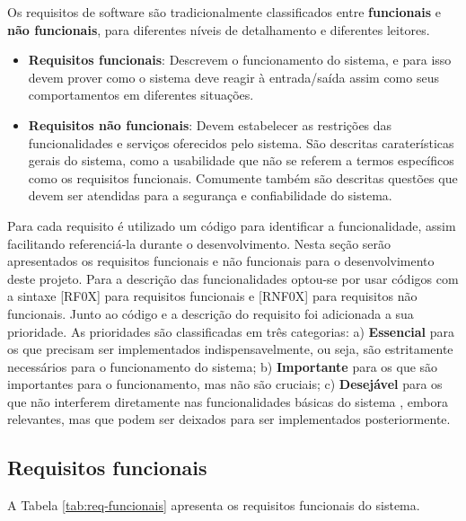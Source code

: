 Os requisitos de software são tradicionalmente classificados entre \textbf{funcionais} e \textbf{não funcionais}, para diferentes níveis de detalhamento e diferentes leitores.

\begin{itemize}
	\item{\textbf{Requisitos funcionais}: Descrevem o funcionamento do sistema, e para isso devem prover como o sistema deve reagir à entrada/saída assim como seus comportamentos em diferentes situações.}
	
	\item{\textbf{Requisitos não funcionais}: Devem estabelecer as restrições das funcionalidades e serviços oferecidos pelo sistema. São descritas caraterísticas gerais do sistema, como a usabilidade que não se referem a termos específicos como os requisitos funcionais. Comumente também são descritas questões que devem ser atendidas para a segurança e confiabilidade do sistema.}
\end{itemize}

Para cada requisito é utilizado um código para identificar a funcionalidade, assim facilitando referenciá-la durante o desenvolvimento. Nesta seção serão apresentados os requisitos funcionais e não funcionais para o desenvolvimento deste projeto. Para a descrição das funcionalidades optou-se por usar códigos com a sintaxe [RF0X] para requisitos funcionais e [RNF0X] para requisitos não funcionais. Junto ao código e a descrição do requisito foi adicionada a sua prioridade. As prioridades são classificadas em três categorias: a) \textbf{Essencial} para os que precisam ser implementados indispensavelmente, ou seja, são estritamente necessários para o funcionamento do sistema; b) \textbf{Importante} para os que são importantes para o funcionamento, mas não são cruciais; c) \textbf{Desejável} para os que não interferem diretamente nas funcionalidades básicas do sistema , embora relevantes, mas que podem ser deixados para ser implementados posteriormente.

\subsection{Requisitos funcionais}

A Tabela \ref{tab:req-funcionais} apresenta os requisitos funcionais do sistema.


